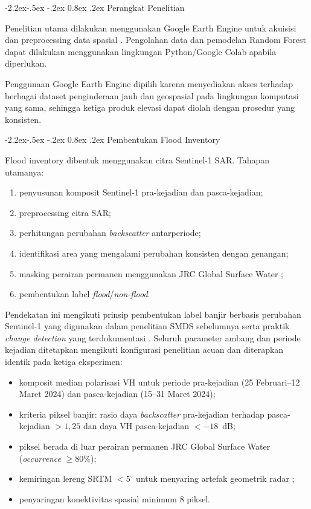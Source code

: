 \documentclass[12pt,a4paper]{article}
\makeatletter
\renewcommand\subsection{\@startsection{subsection}{2}{\z@}%
  {-2.2ex\@plus -.5ex \@minus -.2ex}%
  {0.8ex \@plus .2ex}%
  {\normalfont\normalsize\bfseries}}
\makeatother
\begin{document}
\subsection{Perangkat Penelitian}

Penelitian utama dilakukan menggunakan Google Earth Engine untuk akuisisi
dan preprocessing data spasial \citep{gorelick2017}. Pengolahan data dan
pemodelan Random Forest dapat dilakukan menggunakan lingkungan
Python/Google Colab apabila diperlukan.

Penggunaan Google Earth Engine dipilih karena menyediakan akses terhadap
berbagai dataset penginderaan jauh dan geospasial pada lingkungan komputasi
yang sama, sehingga ketiga produk elevasi dapat diolah dengan prosedur yang
konsisten.

\subsection{Pembentukan Flood Inventory}
\label{ssec:flood-inventory}

Flood inventory dibentuk menggunakan citra Sentinel-1 SAR. Tahapan utamanya:

\begin{enumerate}
\item penyusunan komposit Sentinel-1 pra-kejadian dan pasca-kejadian;
\item preprocessing citra SAR;
\item perhitungan perubahan \textit{backscatter} antarperiode;
\item identifikasi area yang mengalami perubahan konsisten dengan genangan;
\item masking perairan permanen menggunakan JRC Global Surface Water
\citep{pekel2016};
\item pembentukan label \textit{flood}/\textit{non-flood}.
\end{enumerate}

Pendekatan ini mengikuti prinsip pembentukan label banjir berbasis perubahan
Sentinel-1 yang digunakan dalam penelitian SMDS sebelumnya \citep{hakim2026}
serta praktik \textit{change detection} yang terdokumentasi
\citep{islammeng2022,unspider2024}. Seluruh parameter ambang dan periode
kejadian ditetapkan mengikuti konfigurasi penelitian acuan \citep{hakim2026}
dan diterapkan identik pada ketiga eksperimen:

\begin{itemize}
\item komposit median polarisasi VH untuk periode pra-kejadian
(25 Februari--12 Maret 2024) dan pasca-kejadian (15--31 Maret 2024);
\item kriteria piksel banjir: rasio daya \textit{backscatter} pra-kejadian
terhadap pasca-kejadian $>1{,}25$ dan daya VH pasca-kejadian $<-18$~dB;
\item piksel berada di luar perairan permanen JRC Global Surface Water
(\textit{occurrence} $\geq 80\%$);
\item kemiringan lereng SRTM $<5^{\circ}$ untuk menyaring artefak geometrik
radar \citep{hakim2026};
\item penyaringan konektivitas spasial minimum 8 piksel.
\end{itemize}
\end{document}
